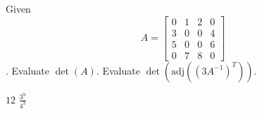 
\begin{Exercise}[
name={},
title={}, 
difficulty=0,
origin={\cite{YL}}]
Given
\[
A=
\begin{bmatrix}
0 & 1 & 2 & 0\\
3 & 0 & 0 & 4\\
5 & 0 & 0 & 6\\
0 & 7 & 8 & 0 
\end{bmatrix}
\].
\Question Evaluate $\det(A)$.
\Question Evaluate $\det\left(\text{adj}\left((3A^{-1})^T\right)\right)$.
\end{Exercise}

\begin{Answer}
\begin{multicols}{2}
\Question $12$
\Question $\frac{3^9}{4^3}$
\EndCurrentQuestion
\end{multicols}
\end{Answer}
